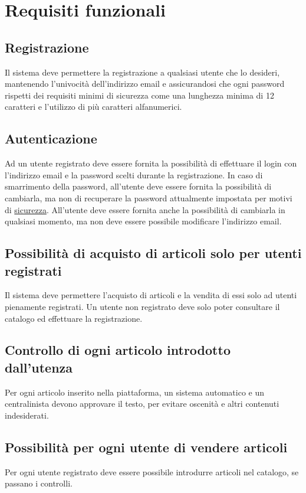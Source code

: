 \documentclass[12pt,a4paper]{article}
\begin{document}
\newpage
\section{Requisiti funzionali}
\subsection{Registrazione}
Il sistema deve permettere la registrazione a qualsiasi utente che lo desideri, mantenendo l'univocità dell'indirizzo email e assicurandosi che ogni password rispetti dei requisiti minimi di sicurezza come una lunghezza minima di 12 caratteri e l'utilizzo di più caratteri alfanumerici.

\subsection{Autenticazione}
Ad un utente registrato deve essere fornita la possibilità di effettuare il login con l'indirizzo email e la password scelti durante la registrazione. In caso di smarrimento della password, all'utente deve essere fornita la possibilità di cambiarla, ma non di recuperare la password attualmente impostata per motivi di  \hyperref[sec:security]{sicurezza}. All'utente deve essere fornita anche la possibilità di cambiarla in qualsiasi momento, ma non deve essere possibile modificare l'indirizzo email.

\subsection{Possibilità di acquisto di articoli solo per utenti registrati}
Il sistema deve permettere l'acquisto di articoli e la vendita di essi solo ad utenti pienamente registrati. Un utente non registrato deve solo poter consultare il catalogo ed effettuare la registrazione.

\subsection{Controllo di ogni articolo introdotto dall'utenza}
Per ogni articolo inserito nella piattaforma, un sistema automatico e un centralinista devono approvare il testo, per evitare oscenità e altri contenuti indesiderati.

\subsection{Possibilità per ogni utente di vendere articoli}
Per ogni utente registrato deve essere possibile introdurre articoli nel catalogo, se passano i controlli.
\end{document}
